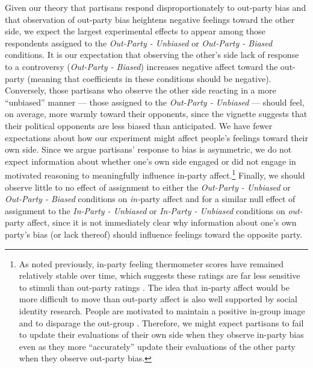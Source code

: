\documentclass[12pt, letterpaper]{article}
\begin{document}
Given our theory that partisans respond disproportionately to out-party bias and that observation of out-party bias heightens negative feelings toward the other side, we expect the largest experimental effects to appear among those respondents assigned to the \textit{Out-Party - Unbiased} or \textit{Out-Party - Biased} conditions. It is our expectation that observing the other's side lack of response to a controversy (\textit{Out-Party - Biased}) increases negative affect toward the out-party (meaning that coefficients in these conditions should be negative). Conversely, those partisans who observe the other side reacting in a more ``unbiased'' manner --- those assigned to the \textit{Out-Party - Unbiased} --- should feel, on average, more warmly toward their opponents, since the vignette suggests that their political opponents are less biased than anticipated. We have fewer expectations about how our experiment might affect people's feelings toward their own side. Since we argue partisans' response to bias is asymmetric, we do not expect information about whether one's own side engaged or did not engage in motivated reasoning to meaningfully influence in-party affect.\footnote{As noted previously, in-party feeling thermometer scores have remained relatively stable over time, which suggests these ratings are far less sensitive to stimuli than out-party ratings \citep{haidthetherington_2012, IyengarSoodLelkes2012}. The idea that in-party affect would be more difficult to move than out-party affect is also well supported by social identity research. People are motivated to maintain a positive in-group image and to disparage the out-group \citep{tajfelturner_1979}. Therefore, we might expect partisans to fail to update their evaluations of their own side when they observe in-party bias even as they more ``accurately'' update their evaluations of the other party when they observe out-party bias.} Finally, we should observe little to no effect of assignment to either the \textit{Out-Party - Unbiased} or \textit{Out-Party - Biased} conditions on \textit{in-}party affect and for a similar null effect of assignment to the \textit{In-Party - Unbiased} or \textit{In-Party - Unbiased} conditions on \textit{out-}party affect, since it is not immediately clear why information about one's own party's bias (or lack thereof) should influence feelings toward the opposite party. 
\end{document}
